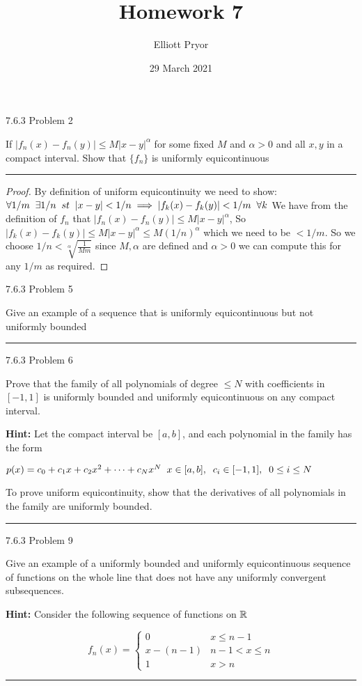 \documentclass[11pt]{article}
\title{Homework 7}
\author{Elliott Pryor}
\date{29 March 2021}
\begin{document}
\maketitle

 7.6.3 Problem 2

If $|f_n(x) - f_n(y)| \leq M |x - y|^\alpha$ for some fixed $M$ and $\alpha > 0$
and all $x,y$ in a compact interval. Show that $\{f_n\}$ is uniformly
equicontinuous

\hrule

\begin{proof}
    
    By definition of uniform equicontinuity we need to show:
    $\forall 1/m \sp \exists 1/n \sp st \sp |x - y| < 1/n \implies |f_k(x) - f_k(y)| < 1/m \sp \forall k$
    We have from the definition of $f_n$ that $|f_n(x) - f_n(y)| \leq M |x - y|^\alpha$,
    So $|f_k(x) - f_k(y)| \leq M |x - y|^\alpha \leq M (1/n)^\alpha$ which we need to be $< 1/m$.
    So we choose $1/n < \sqrt[\alpha]{\frac{1}{Mm}}$ since $M, \alpha$ are defined and $\alpha > 0$
    we can compute this for any $1/m$ as required.
\end{proof}



 7.6.3 Problem 5

Give an example of a sequence that is uniformly equicontinuous 
but not uniformly bounded

\hrule



 7.6.3 Problem 6

Prove that the family of all polynomials of degree $\leq N$ with
coefficients in $[-1,1]$ is uniformly bounded and uniformly
equicontinuous on any compact interval. 

\textbf{Hint: }
Let the compact interval be $[a, b]$, and each polynomial in the family has the form

$p(x) = c_0 + c_1 x + c_2 x^2 + \dots + c_N x^N \sp x \in [a,b], \sp c_i \in [-1, 1], \sp 0 \leq i \leq N$

To prove uniform equicontinuity, show that the derivatives of all polynomials in the 
family are uniformly bounded.

\hrule




 7.6.3 Problem 9

Give an example of a uniformly bounded and uniformly equicontinuous
sequence of functions on the whole line that does not have any uniformly
convergent subsequences.

\textbf{Hint: } Consider the following sequence of functions on $\reals$

$$f_n(x) = \begin{cases}
    0 & x \leq n-1\\
    x - (n-1) & n-1 < x \leq n\\
    1 & x > n
\end{cases}$$

\hrule
\end{document}
